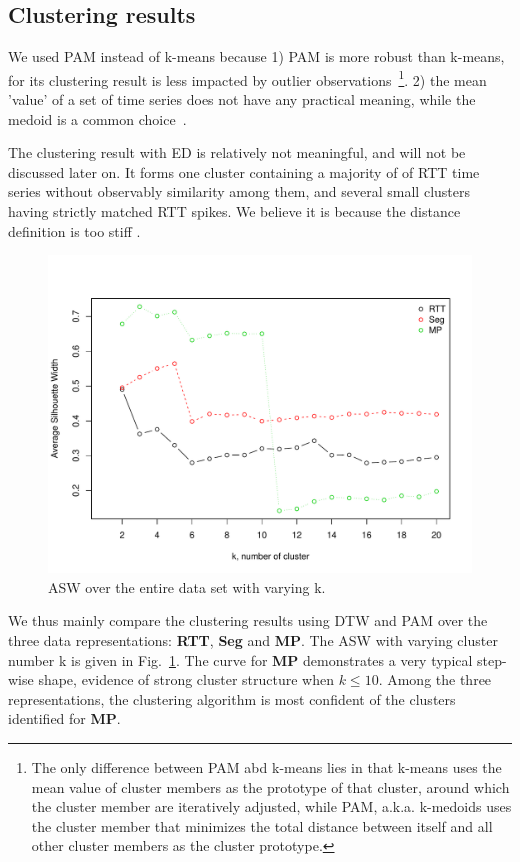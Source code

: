 \subsection{Clustering results}

We used \ac{PAM} instead of k-means because 1) \ac{PAM} is more robust than k-means, for its clustering result is less impacted by outlier observations~\footnote{The only difference between \ac{PAM} abd k-means lies in that k-means uses the mean value of cluster members as the prototype of that cluster, around which the cluster member are iteratively adjusted, while \ac{PAM}, a.k.a. k-medoids uses the cluster member that minimizes the total distance between itself and all other cluster members as the cluster prototype.}.
2) the mean 'value' of a set of time series does not have any practical meaning, while the medoid is a common choice~\cite{Aghabozorgi2015}. 

The clustering result with \ac{ED} is relatively not meaningful, and will not be discussed later on. It forms one cluster containing a majority of of RTT time series without observably similarity among them, and several small clusters having strictly matched RTT spikes. We believe it is because the distance definition is too stiff .

\begin{figure}[!htb]
\centering
\includegraphics[width=.8\textwidth]{gfx/chap3/sil_comp.pdf}
\caption{\ac{ASW} over the entire data set with varying k.}
\label{fig:sil_comp}
\end{figure}
We thus mainly compare the clustering results using \ac{DTW} and \ac{PAM} over the three data representations: \textbf{RTT}, \textbf{Seg} and \textbf{MP}. The \ac{ASW} with varying cluster number k is given in Fig.~\ref{fig:sil_comp}. The curve for \textbf{MP} demonstrates a very typical step-wise shape, evidence of strong cluster structure when $k \leq 10$. Among the three representations, the clustering algorithm is most confident of the clusters identified for \textbf{MP}.

